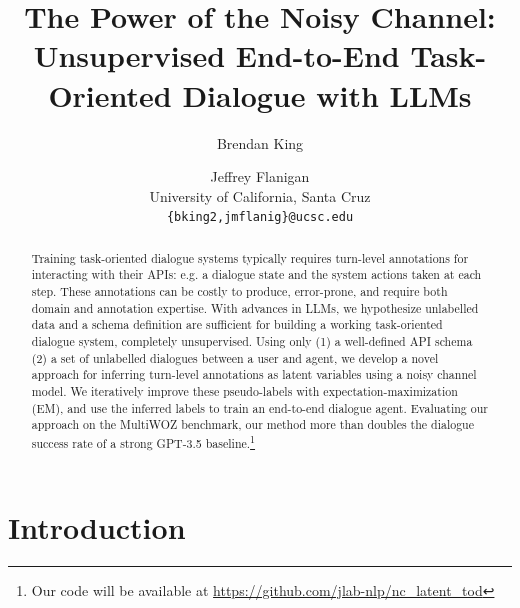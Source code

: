 \documentclass[11pt]{article}
\title{The Power of the Noisy Channel: Unsupervised End-to-End Task-Oriented Dialogue with LLMs}
\author{Brendan King \and Jeffrey Flanigan\\
  University of California, Santa Cruz \\
  \texttt{\{bking2,jmflanig\}@ucsc.edu}}
\newcommand{\bdk}[1]{}
\newcommand{\jmf}[1]{}
\begin{document}
\maketitle
\begin{abstract}
Training task-oriented dialogue systems typically requires turn-level annotations for interacting with their APIs: e.g. a dialogue state and the system actions taken at each step. 
These annotations can be costly to produce, error-prone, and require both domain and annotation expertise. 
With advances in LLMs, we hypothesize unlabelled data and a schema definition are sufficient for building a working task-oriented dialogue system, completely unsupervised.
Using only (1) a well-defined API schema (2) a set of unlabelled dialogues between a user and agent, we develop a novel approach for inferring turn-level annotations as latent variables using a noisy channel model.
We iteratively improve these pseudo-labels with expectation-maximization (EM), and use the inferred labels to train an end-to-end dialogue agent.
Evaluating our approach on the MultiWOZ benchmark, our method more than doubles the dialogue success rate of a strong GPT-3.5 baseline.\footnote{Our code will be available at \href{https://github.com/jlab-nlp/nc\_latent\_tod}{https://github.com/jlab-nlp/nc\_latent\_tod}}

\end{abstract}

\section{Introduction}
\end{document}
